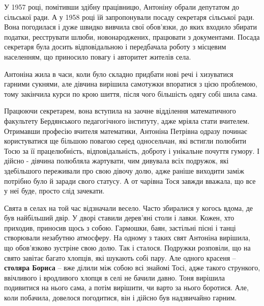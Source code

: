 
У 1957 році, помітивши здібну працівницю, Антоніну обрали депутатом до
сільської ради. А у 1958 році їй запропонували посаду секретаря сільської ради.
Вона погодилася і дуже швидко вивчила свої обов'язки, до яких входило збирати
податки, реєструвати шлюби, новонароджених, працювати з документами. Посада
секретаря була досить відповідальною і передбачала роботу з місцевим
населенням, що приносило повагу і авторитет жителів села.


Антоніна жила в часи, коли було складно придбати нові речі і хизуватися гарними
сукнями, але дівчина вирішила самотужки впоратися з цією проблемою, тому
закінчила курси по крою шиття, після чого більшість одягу собі шила сама.


Працюючи секретарем, вона вступила на заочне відділення математичного
факультету Бердянського педагогічного інституту, адже мріяла стати вчителем.
Отримавши професію вчителя математики, Антоніна Петрівна одразу починає
користуватися ще більшою повагою серед односельчан, які встигли полюбити Тосю
за її працелюбність, відповідальність, доброту і унікальне почуття гумору. І
дійсно - дівчина полюбляла жартувати, чим дивувала всіх подружок, які
здебільшого переживали про свою дівочу долю, адже раніше виходити заміж
потрібно було й заради свого статусу. А от чарівна Тося завжди вважала, що все
у неї буде, просто слід зачекати.


Свята в селах на той час відзначали весело. Часто збиралися у когось вдома, де
був найбільший двір. У дворі ставили дерев'яні столи і лавки. Кожен, хто
приходив, приносив щось з собою. Гармошки, баян, застільні пісні і танці
створювали незабутню атмосферу. На одному з таких свят Антоніна вирішила, що
обов'язково зустріне свою долю. Так і сталося. Подружки розповіли, що на свято
завітає багато хлопців, які шукають собі пару. Але одного красеня – \textbf{столяра
Бориса} – вже ділили між собою всі знайомі Тосі, адже такого стрункого,
ввічливого і вродливого хлопця в селі не бачили давно. Тоня вирішила подивитися
на нього сама, а потім вирішити, чи варто за нього боротися. Але, коли
побачила, довелося погодитися, він і дійсно був надзвичайно гарним.

